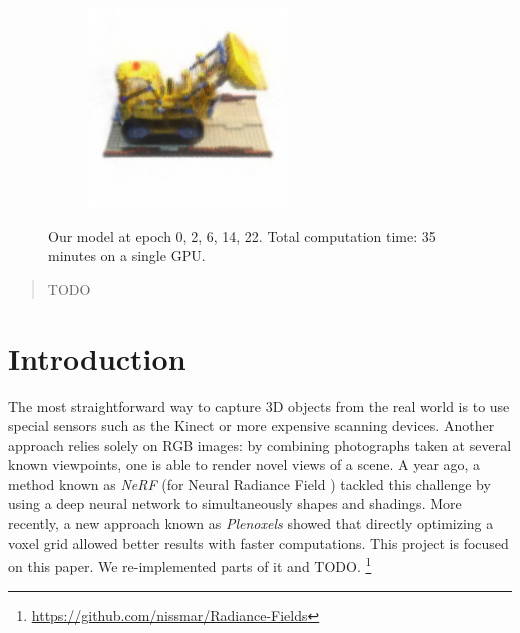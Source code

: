 \documentclass{article}
\begin{document}
\begin{figure}[!h]
\begin{subfigure}{.19\textwidth}
\end{subfigure}
\begin{subfigure}{.19\textwidth}
  \centering
  \includegraphics[width=\linewidth]{figs/model32.png}  
\end{subfigure}
     \caption{Our model at epoch {0, 2, 6, 14, 22}. Total computation time: 35 minutes on a single GPU.}
    \label{fig:lego_optim}
\end{figure}


\begin{abstract}
\lipsum[0-1] TODO
\cite{plenoxels}
\cite{nerf}
\cite{spacecarving}
\cite{directvoxgo}
\cite{instant}
\end{abstract}


\section{Introduction}

The most straightforward way to capture 3D objects from the real world is to use special sensors such as the Kinect or more expensive scanning devices. Another approach relies solely on RGB images: by combining photographs taken at several known viewpoints, one is able to render novel views of a scene. A year ago, a method known as \textit{NeRF} (for Neural Radiance Field \cite{nerf}) tackled this challenge by using a deep neural network to simultaneously shapes and shadings. More recently, a new approach known as \textit{Plenoxels} \cite{plenoxels} showed that directly optimizing a voxel grid allowed better results with faster computations. This project is focused on this paper. We re-implemented parts of it and TODO.
\footnote{\url{https://github.com/nissmar/Radiance-Fields}}
\end{document}
